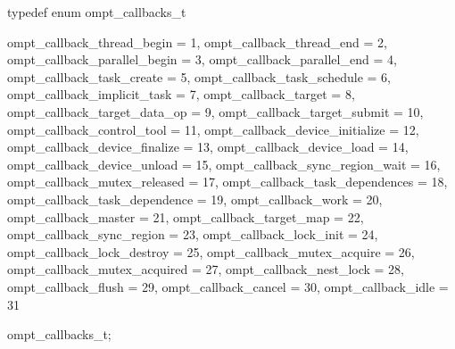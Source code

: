 \begin{ccppspecific}
\begin{omptEnum}
typedef enum ompt_callbacks_t {
  ompt_callback_thread_begin             = 1,
  ompt_callback_thread_end               = 2,
  ompt_callback_parallel_begin           = 3,
  ompt_callback_parallel_end             = 4,
  ompt_callback_task_create              = 5,
  ompt_callback_task_schedule            = 6,
  ompt_callback_implicit_task            = 7,
  ompt_callback_target                   = 8,
  ompt_callback_target_data_op           = 9,
  ompt_callback_target_submit            = 10,
  ompt_callback_control_tool             = 11,
  ompt_callback_device_initialize        = 12,
  ompt_callback_device_finalize          = 13,
  ompt_callback_device_load              = 14,
  ompt_callback_device_unload            = 15,
  ompt_callback_sync_region_wait         = 16,
  ompt_callback_mutex_released           = 17,
  ompt_callback_task_dependences         = 18,
  ompt_callback_task_dependence          = 19,
  ompt_callback_work                     = 20,
  ompt_callback_master                   = 21,
  ompt_callback_target_map               = 22,
  ompt_callback_sync_region              = 23,
  ompt_callback_lock_init                = 24,
  ompt_callback_lock_destroy             = 25,
  ompt_callback_mutex_acquire            = 26,
  ompt_callback_mutex_acquired           = 27,
  ompt_callback_nest_lock                = 28,
  ompt_callback_flush                    = 29,
  ompt_callback_cancel                   = 30,
  ompt_callback_idle                     = 31

} ompt_callbacks_t;
\end{omptEnum}
\end{ccppspecific}



